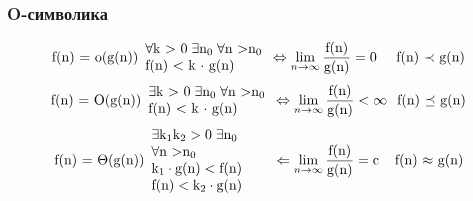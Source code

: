 \documentclass[russian, 12pt]{beamer}
\begin{document}
\begin{frame}
\frametitle{O-символика}
\begin{equation*}
\text{f(n) = o(g(n))}
  \begin{array}{l}
  \forall\text{k > 0}\;\exists\text{n}_0\;  \forall \text{n >}\text{n}_0  \\
  \text{f(n) < k $\cdot$ g(n)}
  \end{array}
\Leftrightarrow
\lim_{n\rightarrow\infty}\frac{\text{f(n)}}{\text{g(n)}}=\text{0}
\hspace{0.49cm}
\text{f(n) $\prec$ g(n)}
\end{equation*}
\vspace{0.3cm}
\begin{equation*}
\text{f(n) = O(g(n))}
  \begin{array}{l}
    \exists\text{k > 0}\;\exists\text{n}_0\;  \forall \text{n >}\text{n}_0  \\
    \text{f(n) < k $\cdot$ g(n)}
  \end{array}
\Leftrightarrow
\lim_{n\rightarrow\infty}\frac{\text{f(n)}}{\text{g(n)}}<\infty
\hspace{0.25cm}
\text{f(n) $\preceq$ g(n)}
\end{equation*}
\vspace{0.3cm}
\begin{equation*}
\text{f(n) = $\Theta$(g(n))}
  \begin{array}{l}
    \exists\text{k}_1\text{k}_2 >\text{0}\;\exists\text{n}_0\hspace{0.5cm}\\
    \forall \text{n >}\text{n}_0\\
    \text{k}_1 \cdot \text{g(n)} < \text{f(n)}\\
    \text{f(n)} < \text{k}_2 \cdot \text{g(n)}
  \end{array}
\hspace{0.2cm}
\Leftarrow
\lim_{n\rightarrow\infty}\frac{\text{f(n)}}{\text{g(n)}}=\text{c}
\hspace{0.4cm}
\text{f(n) $\approx$ g(n)}
\end{equation*}
\end{frame}
\lstset{style=mystyle}
\begin{frame}

\end{frame}
\end{document}
